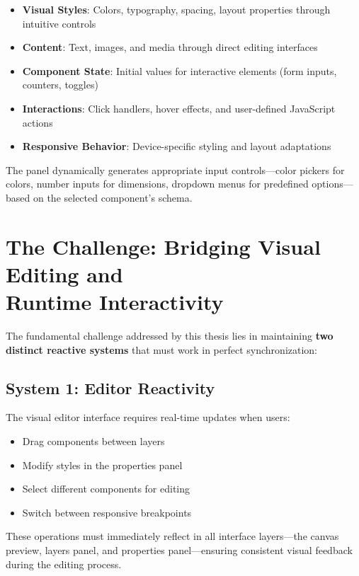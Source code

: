 \documentclass[oneside,11pt]{book}
\begin{document}
\begin{itemize}
    \item \textbf{Visual Styles}: Colors, typography, spacing, layout properties through intuitive controls
    \item \textbf{Content}: Text, images, and media through direct editing interfaces
    \item \textbf{Component State}: Initial values for interactive elements (form inputs, counters, toggles)
    \item \textbf{Interactions}: Click handlers, hover effects, and user-defined JavaScript actions
    \item \textbf{Responsive Behavior}: Device-specific styling and layout adaptations
\end{itemize}

The panel dynamically generates appropriate input controls—color pickers for colors, number inputs for dimensions, dropdown menus for predefined options—based on the selected component's schema.

\section{The Challenge: Bridging Visual Editing and\\Runtime Interactivity}
\label{sec:bridging-challenge}

The fundamental challenge addressed by this thesis lies in maintaining \textbf{two distinct reactive systems} that must work in perfect synchronization:

\subsection{System 1: Editor Reactivity}
The visual editor interface requires real-time updates when users:
\begin{itemize}
    \item Drag components between layers
    \item Modify styles in the properties panel
    \item Select different components for editing
    \item Switch between responsive breakpoints
\end{itemize}

These operations must immediately reflect in all interface layers—the canvas preview, layers panel, and properties panel—ensuring consistent visual feedback during the editing process.
\end{document}
